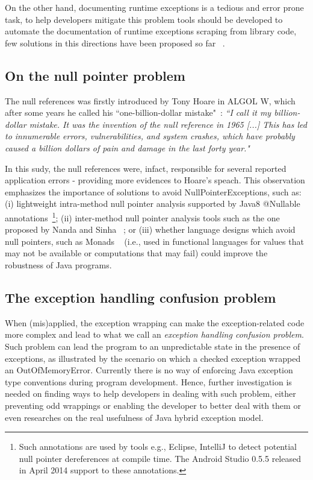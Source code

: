 \documentclass[conference]{IEEEtran}
\begin{document}
On the other hand, documenting runtime exceptions is a tedious and error prone task, to help developers
mitigate this problem tools should be developed to automate the documentation of runtime exceptions
scraping from library code, few solutions in this directions have been proposed so far ~\cite{van2005combining}. 

\subsection{On the null pointer problem}
The null references was firstly introduced by Tony Hoare in ALGOL W, which after some years he called his ``one-billion-dollar mistake"~\cite{hoare2}:
\emph{``I call it my billion-dollar mistake. It was the invention of the null reference in 1965 [...] This has led to innumerable errors, vulnerabilities, and system 
crashes, which have probably caused a billion dollars of pain and damage in the last forty year."}

In this sudy, the null references were, infact, responsible for several reported application errors - providing more evidences to Hoare's speach.
This observation emphasizes the importance of solutions to avoid NullPointerExceptions, such as:
(i) lightweight intra-method null pointer analysis supported by Java8 @Nullable annotations~\footnote{Such annotations are used by tools e.g., Eclipse, IntelliJ to detect potential 
null pointer dereferences at compile time. The Android Studio 0.5.5 released in April 2014 support to these annotations.};
(ii) inter-method null pointer analysis tools such as the one proposed by Nanda and Sinha ~\cite{nanda2009accurate};
or (iii) whether language designs which avoid null pointers, such 
as Monads ~\cite{Walde95} (i.e., used in functional languages for values that may not be available 
or computations that may fail) could improve the robustness of Java programs. 


\subsection{The exception handling confusion problem}
When (mis)applied, the exception wrapping can make the exception-related code
 more complex and lead to what we call an \emph{exception handling confusion problem}.
Such problem can lead the program to an unpredictable state in the presence of exceptions,
as illustrated by the scenario on which a checked exception wrapped an OutOfMemoryError. 
Currently there is no way of enforcing Java exception type conventions during program development.
Hence, further investigation is needed on finding ways to help developers in dealing with such
 problem, either preventing odd wrappings or enabling the developer to better deal with them or even
researches on the real usefulness of Java hybrid exception model. 
\end{document}
